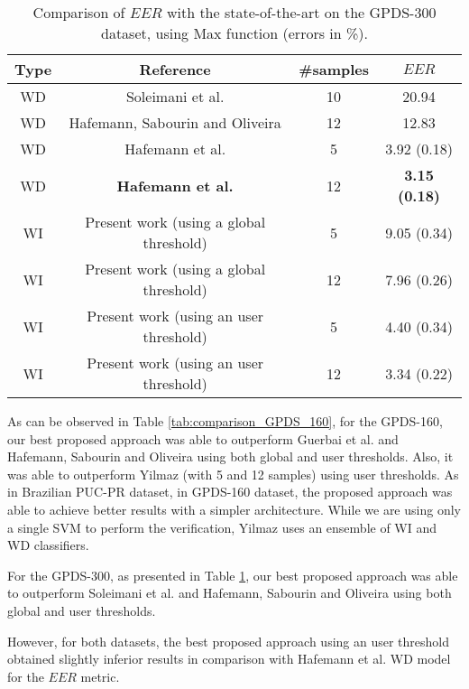 \documentclass[conference]{IEEEtran}
\begin{document}
\begin{table}[!htb]
\caption{Comparison of $EER$ with the state-of-the-art on the GPDS-300 dataset, using Max function (errors in \%).}
\label{tab:comparison_GPDS_300}
\scriptsize
\centering


\begin{tabular}{cccc}
\hline
Type & Reference & \#samples & $EER$ \\ 
\hline
WD & Soleimani et al. \cite{soleimani:16} & 10  &  20.94 \\ 
WD & Hafemann, Sabourin and Oliveira \cite{hafemann:16} & 12  & 12.83 \\ 
WD & Hafemann et al. \cite{hafemann:17} & 5  &  3.92 (0.18) \\ 
WD & \textbf{Hafemann et al. \cite{hafemann:17}} & 12  &  \textbf{3.15 (0.18)} \\ 
WI & Present work (using a global threshold) & 5 & 9.05 (0.34) \\ 
WI & Present work (using a global threshold) & 12 & 7.96 (0.26) \\ 
WI & Present work (using an user threshold) & 5 & 4.40 (0.34) \\ 
WI & Present work (using an user threshold) & 12 & 3.34 (0.22) \\ 
\hline


\end{tabular}
\end{table}


As can be observed in Table \ref{tab:comparison_GPDS_160}, for the GPDS-160, our best proposed approach was able to outperform Guerbai et al. \cite{guerbai:15} and Hafemann, Sabourin and Oliveira \cite{hafemann:16} using both global and user thresholds. Also, it was able to outperform Yilmaz \cite{yilmaz:16} (with 5 and 12 samples) using user thresholds. 
As in Brazilian PUC-PR dataset, in GPDS-160 dataset, the proposed approach was able to achieve better results with a simpler architecture. While we are using only a single SVM to perform the verification, Yilmaz \cite{yilmaz:16} uses an ensemble of WI and WD classifiers.


For the GPDS-300, as presented in Table \ref{tab:comparison_GPDS_300}, our best proposed approach was able to outperform Soleimani et al. \cite{soleimani:16} and Hafemann, Sabourin and Oliveira \cite{hafemann:16} using both global and user thresholds. 


However, for both datasets, the best proposed approach using an user threshold obtained slightly inferior results in comparison with Hafemann et al. WD model \cite{hafemann:17} for the $EER$ metric. 
\end{document}
